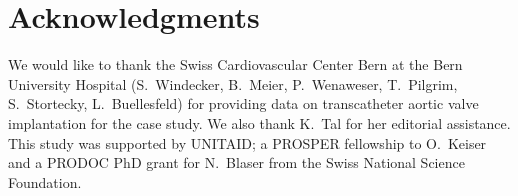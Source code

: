 \section*{Acknowledgments}

We would like to thank the 
Swiss Cardiovascular Center Bern at the 
Bern University Hospital (S.~Windecker, B.~Meier, P.~Wenaweser, T.~Pilgrim, S.~Stortecky, L.~Buellesfeld) for providing data on transcatheter aortic valve implantation for the case study. 
We also thank K.~Tal for her editorial assistance.
This study was supported by UNITAID; a PROSPER fellowship to O.~Keiser and a PRODOC PhD grant for N.~Blaser from the Swiss National Science Foundation.


